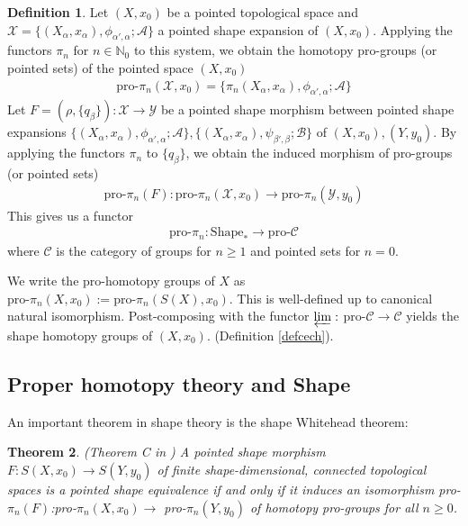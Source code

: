\documentclass[a4paper,11pt]{article}
\theoremstyle{definition}
\newtheorem{definition}{Definition}[section]
\theoremstyle{plain}
\newtheorem{theorem}[definition]{Theorem}
\theoremstyle{remark}
\begin{document}
{\begin{definition} Let $(X,x_0)$ be a pointed topological space and $\mathcal{X} = \{(X_{\alpha}, x_\alpha), \phi_{\alpha',\alpha}; \mathcal{A}\}$ a pointed shape expansion of $(X,x_0)$. Applying the functors $\pi_{n}$ for $n\in \mathbb{N}_{0}$ to this system, we obtain the homotopy pro-groups (or pointed sets) of the pointed space $(X,x_0)$
\begin{align*}
\text{pro-}\pi_{n}(\mathcal{X},x_0) = \{\pi_{n}(X_{\alpha},x_{\alpha}), \phi_{\alpha',\alpha}; \mathcal{A}\}
\end{align*}
Let $F=(\rho,\{q_{\beta}\}): \mathcal{X} \rightarrow \mathcal{Y}$ be a pointed shape morphism between pointed shape expansions $\{(X_{\alpha}, x_\alpha), \phi_{\alpha',\alpha}; \mathcal{A}\},\{(X_{\alpha}, x_\alpha), \psi_{\beta',\beta}; \mathcal{B}\}$ of $(X,x_0),(Y,y_0)$. By applying the functors $\pi_{n}$ to $\{q_{\beta}\}$, we obtain the induced morphism of pro-groups (or pointed sets)
\begin{align*}
\text{pro-}\pi_{n}(F):\text{pro-}\pi_{n}(\mathcal{X},x_0)\rightarrow \text{pro-}\pi_{n}(\mathcal{Y},y_0) 
\end{align*}
This gives us a functor
\begin{align*}
\text{pro-}\pi_{n}: \text{Shape}_{\ast} \rightarrow \text{pro-}\mathcal{C}
\end{align*}
where $\mathcal{C}$ is the category of groups for $n\geq 1$ and pointed sets for $n=0$. 
\end{definition}

We write the pro-homotopy groups of $X$ as $\text{pro-}\pi_{n}(X,x_0):=\text{pro-}\pi_{n}(S(X),x_0)$. This is well-defined up to canonical natural isomorphism. Post-composing with the functor $\varprojlim:$ pro-$\mathcal{C}\rightarrow \mathcal{C}$ yields the shape homotopy groups of $(X,x_0)$. (Definition \ref{defcech}).\\

\subsection{Proper homotopy theory and Shape}

An important theorem in shape theory is the shape Whitehead theorem:

\begin{theorem} \label{shapewhitehead} (Theorem C in \cite{morita1974hurewicz}) A pointed shape morphism $F:S(X,x_0)\rightarrow S(Y,y_0)$ of finite shape-dimensional, connected topological spaces is a pointed shape equivalence if and only if it induces an isomorphism pro-$\pi_{n}(F)$:pro-$\pi_{n}(X,x_0)\rightarrow$ pro-$\pi_{n}(Y,y_0)$ of homotopy pro-groups for all $n\geq 0$. 
\end{theorem}

}
\end{document}
